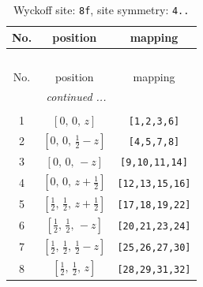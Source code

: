 \documentclass[fleqn,8pt]{jsarticle}
\begin{document}
\begin{longtable}{ccc}
\caption{Wyckoff site: {\tt 8f}, site symmetry: {\tt 4..}}
 \\
 \hline \hline
No. & position & mapping \\ \hline \endfirsthead

\multicolumn{2}{l}{\tablename\ \thetable{}} \\
 \hline \hline
No. & position & mapping \\ \hline \endhead

 \hline \hline
\multicolumn{2}{r}{\footnotesize\it continued ...} \\ \endfoot

 \hline \hline
\multicolumn{2}{r}{} \\ \endlastfoot

1 & $\left[ 0,\, 0,\, z \right]$ & {\tt [1,2,3,6]} \\ \hline
2 & $\left[ 0,\, 0,\, \frac{1}{2} - z \right]$ & {\tt [4,5,7,8]} \\ \hline
3 & $\left[ 0,\, 0,\, - z \right]$ & {\tt [9,10,11,14]} \\ \hline
4 & $\left[ 0,\, 0,\, z + \frac{1}{2} \right]$ & {\tt [12,13,15,16]} \\ \hline
5 & $\left[ \frac{1}{2},\, \frac{1}{2},\, z + \frac{1}{2} \right]$ & {\tt [17,18,19,22]} \\ \hline
6 & $\left[ \frac{1}{2},\, \frac{1}{2},\, - z \right]$ & {\tt [20,21,23,24]} \\ \hline
7 & $\left[ \frac{1}{2},\, \frac{1}{2},\, \frac{1}{2} - z \right]$ & {\tt [25,26,27,30]} \\ \hline
8 & $\left[ \frac{1}{2},\, \frac{1}{2},\, z \right]$ & {\tt [28,29,31,32]} \\
\end{longtable}
\renewcommand{\arraystretch}{1.2}
\end{document}
